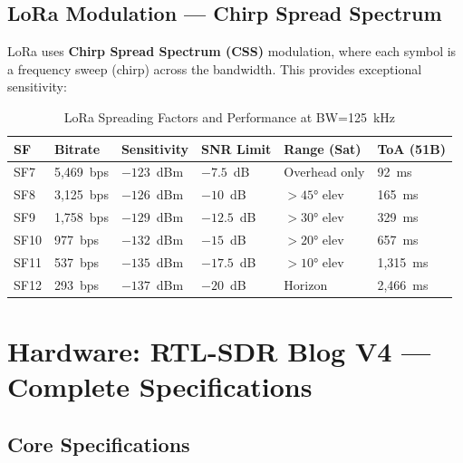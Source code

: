 \documentclass[12pt,a4paper]{article}
\begin{document}
\subsection{LoRa Modulation — Chirp Spread Spectrum}

LoRa uses \textbf{Chirp Spread Spectrum (CSS)} modulation, where each symbol is a 
frequency sweep (chirp) across the bandwidth. This provides exceptional sensitivity:

\begin{table}[h!]
\centering
\caption{LoRa Spreading Factors and Performance at BW=125~kHz}
\begin{tabular}{@{}llllll@{}}
\toprule
\textbf{SF} & \textbf{Bitrate} & \textbf{Sensitivity} & \textbf{SNR Limit} & \textbf{Range (Sat)} & \textbf{ToA (51B)} \\
\midrule
SF7  & 5,469~bps & $-123$~dBm & $-7.5$~dB & Overhead only & 92~ms \\
SF8  & 3,125~bps & $-126$~dBm & $-10$~dB  & $>45°$ elev & 165~ms \\
SF9  & 1,758~bps & $-129$~dBm & $-12.5$~dB & $>30°$ elev & 329~ms \\
SF10 & 977~bps   & $-132$~dBm & $-15$~dB  & $>20°$ elev & 657~ms \\
SF11 & 537~bps   & $-135$~dBm & $-17.5$~dB & $>10°$ elev & 1,315~ms \\
SF12 & 293~bps   & $-137$~dBm & $-20$~dB  & Horizon & 2,466~ms \\
\bottomrule
\end{tabular}
\end{table}

\section{Hardware: RTL-SDR Blog V4 — Complete Specifications}

\subsection{Core Specifications}
\end{document}
